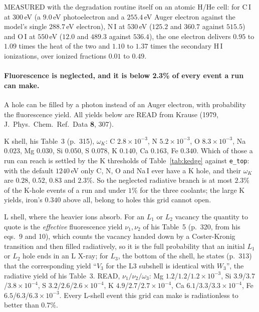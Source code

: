 \documentclass[english,a4paper]{my_memo}
\begin{document}
MEASURED with the degradation routine itself on an atomic H/He cell: for
C\,I at $300\,$eV (a $9.0\,$eV photoelectron and a $255.4\,$eV Auger
electron against the model's single $288.7\,$eV electron), N\,I at
$530\,$eV ($125.2$ and $360.7$ against $515.5$) and O\,I at $550\,$eV
($12.0$ and $489.3$ against $536.4$), the one electron delivers $0.95$ to
$1.09$ times the heat of the two and $1.10$ to $1.37$ times the secondary
H\,I ionizations, over ionized fractions $0.01$ to $0.49$.

\paragraph{Fluorescence is neglected, and it is below 2.3\% of every event a
run can make.} A hole can be filled by a photon instead of an Auger
electron, with probability the fluorescence yield. All yields below are READ
from Krause (1979, J.\ Phys.\ Chem.\ Ref.\ Data \textbf{8}, 307).

K shell, his Table~3 (p.~315), $\omega_K$: C $2.8\times10^{-3}$, N
$5.2\times10^{-3}$, O $8.3\times10^{-3}$, Na $0.023$, Mg $0.030$, Si
$0.050$, S $0.078$, K $0.140$, Ca $0.163$, Fe $0.340$. Which of those a run
can reach is settled by the K thresholds of Table~\ref{tab:kedge} against
\texttt{e\_top}: with the default $1240\,$eV only C, N, O and Na\,I ever
have a K hole, and their $\omega_K$ are $0.28$, $0.52$, $0.83$ and $2.3\%$.
So the neglected radiative branch is at most $2.3\%$ of the K-hole events of
a run and under $1\%$ for the three coolants; the large K yields, iron's
$0.340$ above all, belong to holes this grid cannot open.

L shell, where the heavier ions absorb. For an $L_1$ or $L_2$ vacancy the
quantity to quote is the \emph{effective} fluorescence yield $\nu_1,\nu_2$
of his Table~5 (p.~320, from his eqs.~9 and 10), which counts the vacancy
handed down by a Coster-Kronig transition and then filled radiatively, so it
is the full probability that an initial $L_1$ or $L_2$ hole ends in an L
X-ray; for $L_3$, the bottom of the shell, he states (p.~313) that the
corresponding yield ``$V_3$ for the L3 subshell is identical with $W_3$'',
the radiative yield of his Table~3. READ, $\nu_1/\nu_2/\omega_3$: Mg
$1.2$/$1.2$/$1.2\times10^{-3}$, Si $3.9$/$3.7$/$3.8\times10^{-4}$, S
$3.2$/$2.6$/$2.6\times10^{-4}$, K $4.9$/$2.7$/$2.7\times10^{-4}$, Ca
$6.1$/$3.3$/$3.3\times10^{-4}$, Fe $6.5$/$6.3$/$6.3\times10^{-3}$. Every
L-shell event this grid can make is radiationless to better than $0.7\%$.
\end{document}
